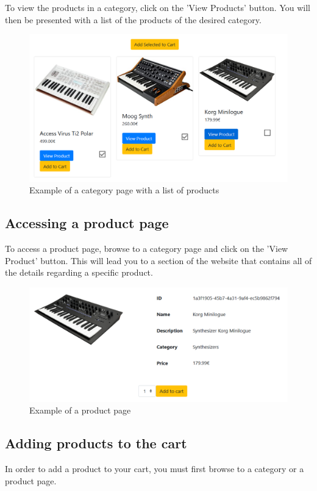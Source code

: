 To view the products in a category, click on the 'View Products' button. You will then be presented with a list of the products of the desired category.

\begin{figure}[H]
\centering
\includegraphics[scale=0.6]{res/Immagini/CategoryPage}
\caption{Example of a category page with a list of products}
\end{figure}

\subsection{Accessing a product page}
To access a product page, browse to a category page and click on the 'View Product' button. This will lead you to a section of the website that contains all of the details regarding a specific product. 

\begin{figure}[H]
\centering
\includegraphics[scale=0.6]{res/Immagini/ProductPage}
\caption{Example of a product page}
\end{figure}

\subsection{Adding products to the cart}
In order to add a product to your cart, you must first browse to a category or a product page.

